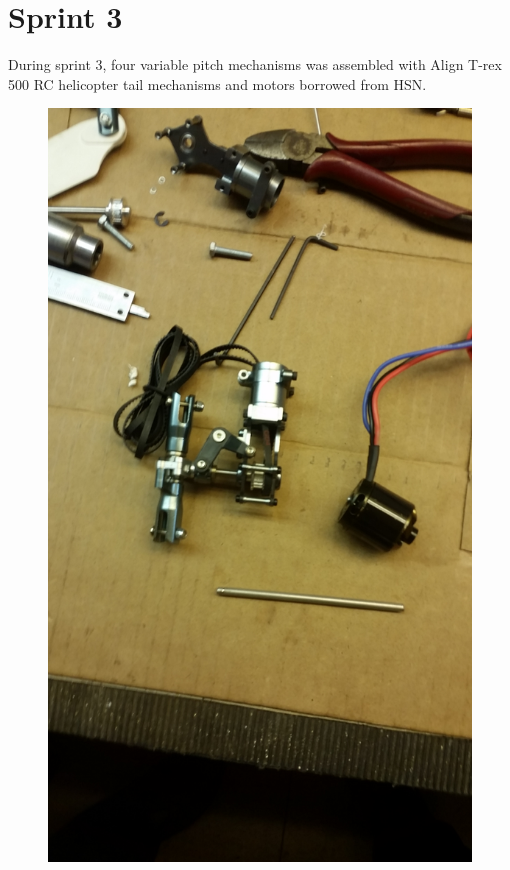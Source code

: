 \section{Sprint 3}

During sprint 3, four variable pitch mechanisms was assembled with Align T-rex 500 RC helicopter tail mechanisms and motors borrowed from HSN. 

\begin{figure}[h]
        \centering
         \begin{minipage}[b]{0.4\textwidth}
            \includegraphics[width = 1\textwidth]{VAPIQ-PICTURES/BeforeAssembly.jpg}

\end{minipage}
\end{figure}
